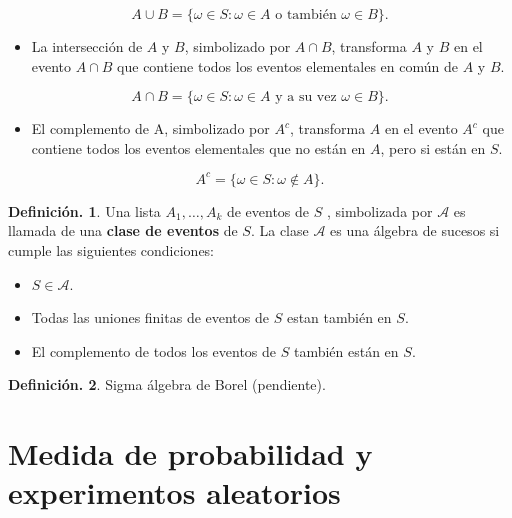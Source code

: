 \documentclass[]{book}
\providecommand{\tightlist}{%
  \setlength{\itemsep}{0pt}\setlength{\parskip}{0pt}}
\theoremstyle{definition}
\newtheorem{definition}{Definición.}[chapter]
\theoremstyle{definition}
\theoremstyle{definition}
\theoremstyle{remark}
\begin{document}
\[A \cup B = \{\omega \in S: \omega \in A \mbox{ o también } \omega \in B
\}. \]

\begin{itemize}
\tightlist
\item
  La intersección de \(A\) y \(B\), simbolizado por \(A \cap B\), transforma \(A\)
  y \(B\) en el evento \(A\cap B\) que contiene todos los eventos elementales
  en común de \(A\) y \(B\).
\end{itemize}

\[A \cap B = \{\omega \in S: \omega \in A \mbox{ y a su vez } \omega \in B
\}. \]

\begin{itemize}
\tightlist
\item
  El complemento de A, simbolizado por \(A^c\), transforma \(A\) en el evento
  \(A^c\) que contiene todos los eventos elementales que no están en \(A\), pero
  si están en \(S\).
\end{itemize}

\[ A^c = \{\omega\in S: \omega \notin A \}. \]

\begin{definition}
\protect\hypertarget{def:unnamed-chunk-118}{}{\label{def:unnamed-chunk-118} }
Una lista \(A_1, \ldots, A_k\) de eventos de \(S\) , simbolizada por
\(\mathcal{A}\) es llamada de una \textbf{clase de eventos} de \(S\).
La clase \(\mathcal{A}\) es una álgebra de sucesos si cumple las siguientes
condiciones:

\begin{itemize}
\item
  \(S \in \mathcal{A}\).
\item
  Todas las uniones finitas de eventos de \(S\) estan también en \(S\).
\item
  El complemento de todos los eventos de \(S\) también están en \(S\).
\end{itemize}
\end{definition}

\begin{definition}
\protect\hypertarget{def:unnamed-chunk-119}{}{\label{def:unnamed-chunk-119} }Sigma álgebra de Borel (pendiente).
\end{definition}

\hypertarget{medida-de-probabilidad-y-experimentos-aleatorios}{%
\section{Medida de probabilidad y experimentos aleatorios}\label{medida-de-probabilidad-y-experimentos-aleatorios}}
\end{document}
